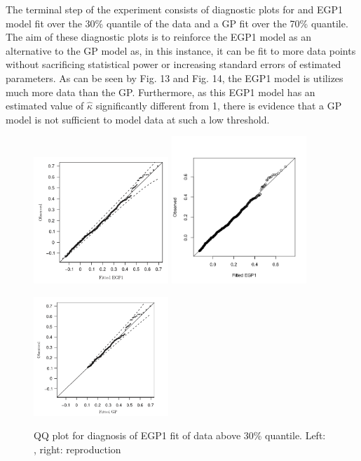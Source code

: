 \documentclass[12pt]{article}
\theoremstyle{definition}
\theoremstyle{definition}
\begin{document}
The terminal step of the experiment consists of diagnostic plots for and EGP1 model fit over the 30\% quantile of the data and a GP fit over the 70\% quantile. The aim of these diagnostic plots is to reinforce the EGP1 model as an alternative to the GP model as, in this instance, it can be fit to more data points without sacrificing statistical power or increasing standard errors of estimated parameters. As can be seen by Fig. 13 and Fig. 14, the EGP1 model is utilizes much more data than the GP. Furthermore, as this EGP1 model has an estimated value of $\hat\kappa$ significantly different from 1, there is evidence that a GP model is not sufficient to model data at such a low threshold.

\begin{figure}[H]
\begin{center}
{\includegraphics[width=2.0in]{project/papafiles/fig8.papa.egp1.png}}
{\includegraphics[width=2.0in]{project/papafiles/fig8.me.egp1.png}}
\caption{QQ plot for diagnosis of EGP1 fit of data above 30\% quantile. Left: \cite{papatawn}, right: reproduction }
{\includegraphics[width=2.0in]{project/papafiles/fig8.papa.gp.png}}

\end{center}
\end{figure}
\end{document}
